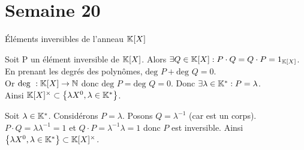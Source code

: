\documentclass{article}
\renewenvironment{question_kholle}[2][ ]
{
	\subsection{\texorpdfstring{#2}{}}
	\notblank{#1}
	{
		\noindent #1
		\bigbreak
	}
	{}
	\begin{proof}
}
{
	\end{proof}
}
\begin{document}
\pagebreak\section{Semaine 20}

	\begin{question_kholle}
		[{\begin{equation}
				\K[X] ^\times = \left\{ \lambda X^0, \lambda \in \K^* \right\}
		\end{equation}}]
		{Éléments inversibles de l'anneau $\mathbb K[X]$}

		Soit P un élément inversible de $\mathbb K[X]$.
		Alors $\exists Q \in \mathbb K[X] : P \cdot Q = Q \cdot P = 1_{\mathbb K[X]}$.
		En prenant les degrés des polynômes, $\text{deg } P + \text{deg } Q = 0$. \\
		Or $\text{deg } : \mathbb K[X] \rightarrow \mathbb N$ donc $\text{deg } P = \text{deg } Q = 0$.
		Donc $\exists \lambda \in \mathbb K^* : P = \lambda$. \\
		Ainsi $\mathbb K[X]^\times \subset \left\{ \lambda X^0, \lambda \in \mathbb K^* \right\}$.

		Soit $\lambda \in \mathbb K^*$. Considérons $P = \lambda$.
		Posons $Q = \lambda^{-1}$ (car \K est un corps). $P \cdot Q = \lambda \lambda^{-1} = 1$ et $Q \cdot P = \lambda^{-1} \lambda = 1$ donc $P$ est inversible. Ainsi $\left\{ \lambda X^0, \lambda \in \mathbb K^* \right\} \subset \mathbb K[X]^\times$.
	\end{question_kholle}
\end{document}
